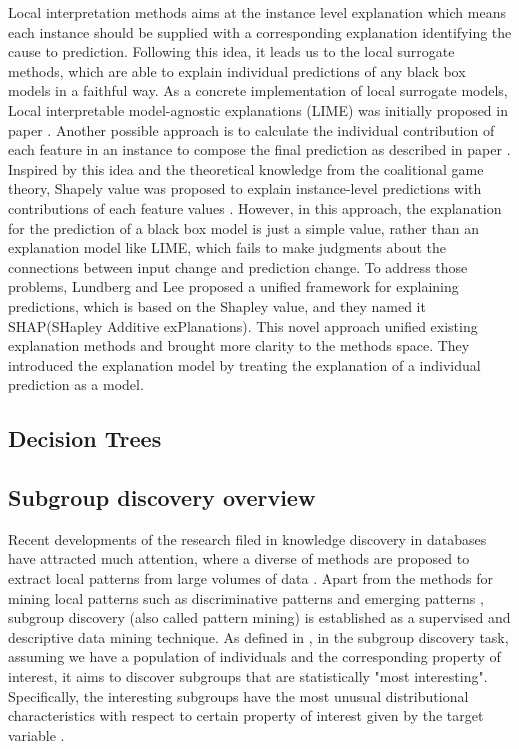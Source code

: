 Local interpretation methods aims at the instance level explanation which means each instance should be supplied with a corresponding explanation identifying the cause to prediction. Following this idea, it leads us to the local surrogate methods, which are able to explain individual predictions of any black box models in a faithful way. As a concrete implementation of local surrogate models, Local interpretable model-agnostic explanations (LIME) was initially proposed in paper \cite{ribeiro2016should}. Another possible approach is to calculate the individual contribution of each feature in an instance to compose the final prediction as described in paper \cite{robnik2008explaining}. Inspired by this idea and the theoretical knowledge from the coalitional game theory, Shapely value was proposed to explain instance-level predictions with contributions of each feature values \cite{kononenko2010efficient}. However, in this approach, the explanation for the prediction of a black box model is just a simple value, rather than an explanation model like LIME, which fails to make judgments about the connections between input change and prediction change. To address those problems, Lundberg and Lee \cite{lundberg2017unified} proposed a unified framework for explaining predictions, which is based on the Shapley value, and they named it SHAP(SHapley Additive exPlanations). This novel approach unified existing explanation methods and brought more clarity to the methods space. They introduced the explanation model by treating the explanation of a individual prediction as a model. 


\subsection{Decision Trees}


\subsection{Subgroup discovery overview}

Recent developments of the research filed in knowledge discovery in databases have attracted much attention, where a diverse of methods are proposed to extract local patterns from large volumes of data  \cite{fayyad1996data}. Apart from the methods for mining local patterns such as discriminative patterns \cite{cheng2008direct} and emerging patterns \cite{dong1999efficient}, subgroup discovery (also called pattern mining) is established as a supervised and descriptive data mining technique. As defined in \cite{herrera2011overview}, in the subgroup discovery task, assuming we have a population of individuals and the corresponding property of interest, it aims to discover subgroups that are statistically "most interesting". Specifically, the interesting subgroups have the most unusual distributional characteristics with respect to certain property of interest given by the target variable \cite{atzmueller2009fast}. 

